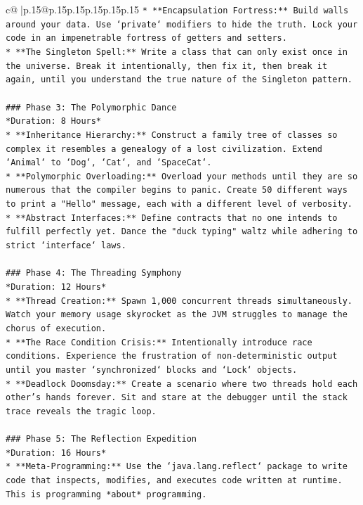 \documentclass{article}
\begin{document}
{\begin{supertabular}{c@{$\;$}|p{.15\linewidth}@{}p{.15\linewidth}p{.15\linewidth}p{.15\linewidth}p{.15\linewidth}p{.15\linewidth}}
{{{\texttt{*   **Encapsulation Fortress:** Build walls around your data. Use `private` modifiers to hide the truth. Lock your code in an impenetrable fortress of getters and setters.} \\
\texttt{*   **The Singleton Spell:** Write a class that can only exist once in the universe. Break it intentionally, then fix it, then break it again, until you understand the true nature of the Singleton pattern.} \\
\\ 
\texttt{\#\#\# Phase 3: The Polymorphic Dance} \\
\texttt{*Duration: 8 Hours*} \\
\texttt{*   **Inheritance Hierarchy:** Construct a family tree of classes so complex it resembles a genealogy of a lost civilization. Extend `Animal` to `Dog`, `Cat`, and `SpaceCat`.} \\
\texttt{*   **Polymorphic Overloading:** Overload your methods until they are so numerous that the compiler begins to panic. Create 50 different ways to print a "Hello" message, each with a different level of verbosity.} \\
\texttt{*   **Abstract Interfaces:** Define contracts that no one intends to fulfill perfectly yet. Dance the "duck typing" waltz while adhering to strict `interface` laws.} \\
\\ 
\texttt{\#\#\# Phase 4: The Threading Symphony} \\
\texttt{*Duration: 12 Hours*} \\
\texttt{*   **Thread Creation:** Spawn 1,000 concurrent threads simultaneously. Watch your memory usage skyrocket as the JVM struggles to manage the chorus of execution.} \\
\texttt{*   **The Race Condition Crisis:** Intentionally introduce race conditions. Experience the frustration of non{-}deterministic output until you master `synchronized` blocks and `Lock` objects.} \\
\texttt{*   **Deadlock Doomsday:** Create a scenario where two threads hold each other's hands forever. Sit and stare at the debugger until the stack trace reveals the tragic loop.} \\
\\ 
\texttt{\#\#\# Phase 5: The Reflection Expedition} \\
\texttt{*Duration: 16 Hours*} \\
\texttt{*   **Meta{-}Programming:** Use the `java.lang.reflect` package to write code that inspects, modifies, and executes code written at runtime. This is programming *about* programming.} \\
}}}
\end{supertabular}}
\end{document}
